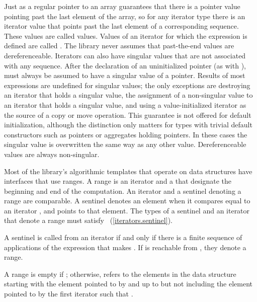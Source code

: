 \pnum
Just as a regular pointer to an array guarantees that there is a pointer value pointing past the last element
of the array, so for any iterator type there is an iterator value that points past the last element of a
corresponding sequence.
These values are called
values.
Values of an iterator
for which the expression
is defined are called
.
The library never assumes that past-the-end values are dereferenceable.
Iterators can also have singular values that are not associated with any
sequence.
\enterexample
After the declaration of an uninitialized pointer
(as with
),
must always be assumed to have a singular value of a pointer.
\exitexample
Results of most expressions are undefined for singular values;
the only exceptions are destroying an iterator that holds a singular value,
the assignment of a non-singular value to
an iterator that holds a singular value, and using a value-initialized iterator
as the source of a copy or move operation. \enternote This guarantee is not
offered for default initialization, although the distinction only matters for types
with trivial default constructors such as pointers or aggregates holding pointers.
\exitnote
In these cases the singular
value is overwritten the same way as any other value.
Dereferenceable
values are always non-singular.

\pnum
Most of the library's algorithmic templates that operate on data structures have
interfaces that use ranges. A range is an iterator and a  that designate
the beginning and end of the computation. An iterator and a sentinel denoting a range
are comparable. A sentinel denotes an element when it compares equal to an iterator
, and  points to that element. The types of a sentinel and an
iterator that denote a range must satisfy ~(\ref{iterators.sentinel}).

\pnum
A sentinel
is called
from an iterator
if and only if there is a finite sequence of applications of
the expression
that makes
.
If
is reachable from
,
they denote a range.

\pnum
A range 
is empty if ;
otherwise, 
refers to the elements in the data structure starting with the element
pointed to by
and up to but not including the element pointed to by
the first iterator  such that .

